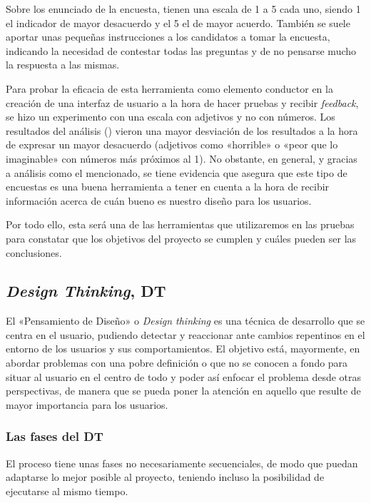 Sobre los enunciado de la encuesta, tienen una escala de 1 a 5 cada uno, siendo 1 el indicador de mayor desacuerdo y el 5 el de mayor acuerdo. También se suele aportar unas pequeñas instrucciones a los candidatos a tomar la encuesta, indicando la necesidad de contestar todas las preguntas y de no pensarse mucho la respuesta a las mismas.

Para probar la eficacia de esta herramienta como elemento conductor en la creación de una interfaz de usuario a la hora de hacer pruebas y recibir \textit{feedback}, se hizo un experimento con una escala con adjetivos y no con números. Los resultados del análisis (\cite{sus}) vieron una mayor desviación de los resultados a la hora de expresar un mayor desacuerdo (adjetivos como «horrible» o «peor que lo imaginable» con números más próximos al 1). No obstante, en general, y gracias a análisis como el mencionado, se tiene evidencia que asegura que este tipo de encuestas es una buena herramienta a tener en cuenta a la hora de recibir información acerca de cuán bueno es nuestro diseño para los usuarios.

Por todo ello, esta será una de las herramientas que utilizaremos en las pruebas para constatar que los objetivos del proyecto se cumplen y cuáles pueden ser las conclusiones.

\subsection{\textit{Design Thinking}, DT}

El «Pensamiento de Diseño» o \textit{Design thinking} es una técnica de desarrollo que se centra en el usuario, pudiendo detectar y reaccionar ante cambios repentinos en el entorno de los usuarios y sus comportamientos. El objetivo está, mayormente, en abordar problemas con una pobre definición o que no se conocen a fondo para situar al usuario en el centro de todo y poder así enfocar el problema desde otras perspectivas, de manera que se pueda poner la atención en aquello que resulte de mayor importancia para los usuarios.

\subsubsection{Las fases del DT}

El proceso tiene unas fases no necesariamente secuenciales, de modo que puedan adaptarse lo mejor posible al proyecto, teniendo incluso la posibilidad de ejecutarse al mismo tiempo.

